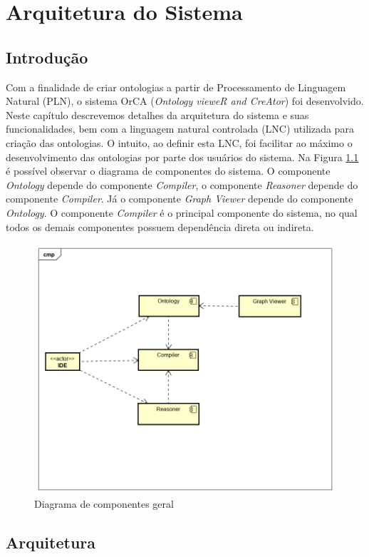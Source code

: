 \documentclass{bcc}
\begin{document}
\chapter{Arquitetura do Sistema}
\label{chap:sistema}

\section{Introdução}
Com a finalidade de criar ontologias a partir de Processamento de Linguagem Natural (PLN), o sistema OrCA (\textit{Ontology vieweR and CreAtor}) foi desenvolvido. Neste capítulo descrevemos detalhes da arquitetura do sistema e suas funcionalidades, bem com a linguagem natural controlada (LNC) utilizada para criação das ontologias. O intuito, ao definir esta LNC, foi facilitar ao máximo o desenvolvimento das ontologias por parte dos usuários do sistema. Na Figura \ref{fig:diagComponenteGeral} é possível observar o diagrama de componentes do sistema. O componente \textit{Ontology} depende do componente \textit{Compiler}, o componente \textit{Reasoner} depende do componente \textit{Compiler}. Já o componente \textit{Graph Viewer} depende do componente \textit{Ontology}. O componente \textit{Compiler} é o principal componente do sistema, no qual todos os demais componentes possuem dependência direta ou indireta.

\begin{figure}[H]
\centering
\includegraphics[width=.7\textwidth]{Figuras/DiagramadeComponentes.png}
\caption{Diagrama de componentes geral}
\label{fig:diagComponenteGeral}
\end{figure}

\section{Arquitetura}
\end{document}
